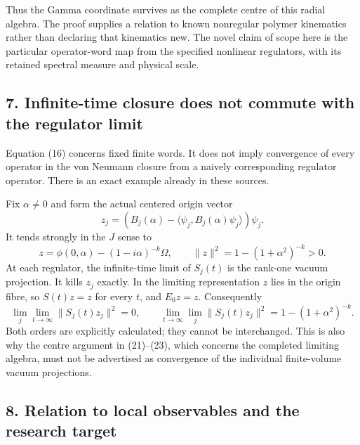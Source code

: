 \documentclass[
  11pt,
]{article}
\begin{document}
Thus the Gamma coordinate survives as the complete centre of this radial
algebra. The proof supplies a relation to known nonregular polymer
kinematics rather than declaring that kinematics new. The novel claim of
scope here is the particular operator-word map from the specified
nonlinear regulators, with its retained spectral measure and physical
scale.

\subsection{7. Infinite-time closure does not commute with the regulator
limit}\label{weak-coupling-part-7-infinite-time-closure-does-not-commute-with-the-regulator-limit}

Equation (16) concerns fixed finite words. It does not imply convergence
of every operator in the von Neumann closure from a naively
corresponding regulator operator. There is an exact example already in
these sources.

Fix \(\alpha\ne0\) and form the actual centered origin vector \[
 z_j=(B_j(\alpha)-\langle\psi_j,B_j(\alpha)\psi_j\rangle)\psi_j .
 \tag{24}
\] It tends strongly in the \(J\) sense to \[
 z=\phi(0,\alpha)-(1-i\alpha)^{-k}\Omega,\qquad
 \|z\|^2=1-(1+\alpha^2)^{-k}>0 .
\] At each regulator, the infinite-time limit of \(S_j(t)\) is the
rank-one vacuum projection. It kills \(z_j\) exactly. In the limiting
representation \(z\) lies in the origin fibre, so \(S(t)z=z\) for every
\(t\), and \(E_0z=z\). Consequently \[
 \lim_j\lim_{t\to\infty}\|S_j(t)z_j\|^2=0,\qquad
 \lim_{t\to\infty}\lim_j\|S_j(t)z_j\|^2
       =1-(1+\alpha^2)^{-k}.
 \tag{25}
\] Both orders are explicitly calculated; they cannot be interchanged.
This is also why the centre argument in (21)--(23), which concerns the
completed limiting algebra, must not be advertised as convergence of the
individual finite-volume vacuum projections.

\subsection{8. Relation to local observables and the research
target}\label{weak-coupling-part-7-relation-to-local-observables-and-the-research-target}
\end{document}
